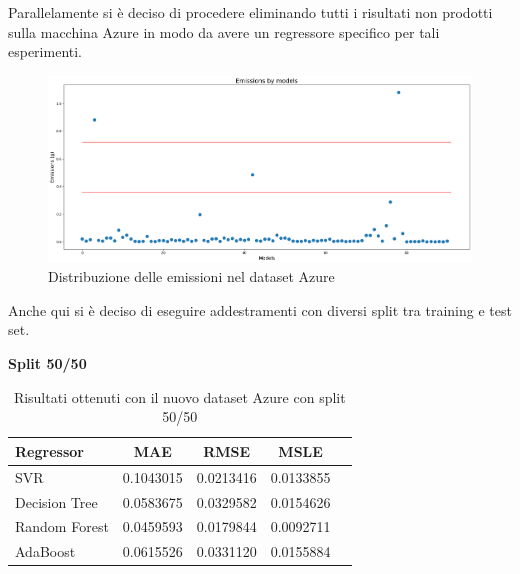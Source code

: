 \noindent Parallelamente si è deciso di procedere eliminando tutti i risultati non prodotti sulla macchina Azure in modo da avere un regressore specifico per tali esperimenti.

\begin{figure}[H]
    \centering
    \includegraphics[width=\textwidth]{images/nuova-situazione2.png}
    \caption{Distribuzione delle emissioni nel dataset Azure}
\end{figure}


\noindent Anche qui si è deciso di eseguire addestramenti con diversi split tra training e test set.

\noindent\textbf{Split 50/50}

\begin{table}[H]
    \centering
    \begin{tabular}{|>{\centering\arraybackslash}m{5cm}|c|c|c|c|}
        \hline
        \textbf{Regressor} & \textbf{MAE} & \textbf{RMSE} & \textbf{MSLE} \\ [10pt]
        \hline
        SVR & 0.1043015 & 0.0213416 & 0.0133855 \\ [10pt]
        \hline
        Decision Tree & 0.0583675 & 0.0329582 & 0.0154626 \\ [10pt]
        \hline
        Random Forest & 0.0459593 & 0.0179844 & 0.0092711 \\ [10pt]
        \hline
        AdaBoost & 0.0615526 & 0.0331120 & 0.0155884 \\ [10pt]
        \hline
    \end{tabular}
    \caption{Risultati ottenuti con il nuovo dataset Azure con split 50/50}
    \label{tab:results}
\end{table}

